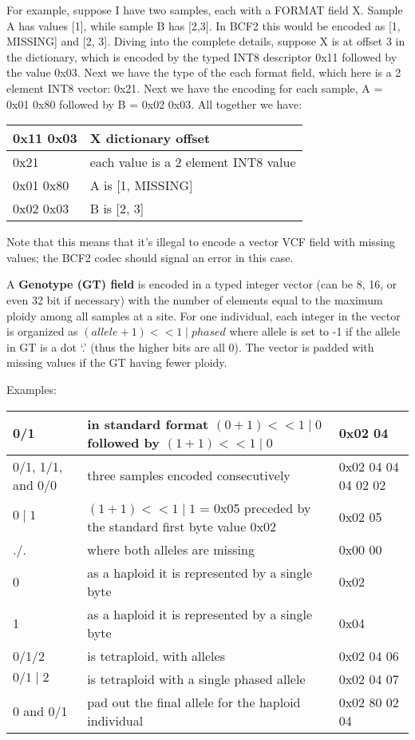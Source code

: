 \documentclass[8pt]{article}
\begin{document}
For example, suppose I have two samples, each with a FORMAT field X.  Sample A has values [1], while sample B has [2,3].  In BCF2 this would be encoded as [1, MISSING] and [2, 3].  Diving into the complete details, suppose X is at offset 3 in the dictionary, which is encoded by the typed INT8 descriptor 0x11 followed by the value 0x03.  Next we have the type of the each format field, which here is a 2 element INT8 vector: 0x21.  Next we have the encoding for each sample, A = 0x01 0x80 followed by B = 0x02 0x03.  All together we have:

\vspace{0.3cm}
\begin{tabular}{|p{2cm} | l |} \hline
0x11 0x03 & X dictionary offset \\ \hline
0x21 & each value is a 2 element INT8 value \\ \hline
0x01 0x80 & A is [1, MISSING] \\ \hline
0x02 0x03 & B is [2, 3] \\ \hline
\end{tabular}
\vspace{0.3cm}

Note that this means that it's illegal to encode a vector VCF field with missing values; the BCF2 codec should signal an error in this case.

\vspace{0.3cm}
A \textbf{Genotype (GT) field} is encoded in a typed integer vector (can be 8, 16, or even 32 bit if necessary) with the number of elements equal to the maximum ploidy among all samples at a site.  For one individual, each integer in the vector is organized as $(allele+1) << 1 \mid phased$ where allele is set to -1 if the allele in GT is a dot `.' (thus the higher bits are all 0).  The vector is padded with missing values if the GT having fewer ploidy.

Examples:

\vspace{0.3cm}
\small
\begin{tabular}{|p{2.5cm} | p{10cm} | p{3cm}|} \hline
0/1 & in standard format $(0 + 1) << 1 \mid 0$ followed by $(1 + 1) << 1 \mid 0$ & 0x02 04 \\ \hline
0/1, 1/1, and 0/0 & three samples encoded consecutively & 0x02 04 04 04 02 02 \\ \hline
$0\mid1$ & $(1 + 1) << 1 \mid 1$ = 0x05 preceded by the standard first byte value 0x02 & 0x02 05 \\ \hline
./. & where both alleles are missing & 0x00 00 \\ \hline
0 & as a haploid it is represented by a single byte & 0x02 \\ \hline
1 & as a haploid it is represented by a single byte & 0x04 \\ \hline
0/1/2 & is tetraploid, with alleles & 0x02 04 06 \\ \hline
$0/1\mid2$ & is tetraploid with a single phased allele & 0x02 04 07 \\ \hline
0 and 0/1 & pad out the final allele for the haploid individual & 0x02 80 02 04\\ \hline
\end{tabular}
\normalsize
\end{document}
